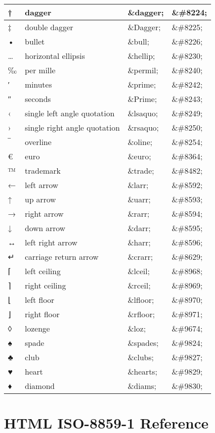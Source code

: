 \begin{longtable}{|l|l|l|l|}
\hline
†	&dagger							&\&dagger;	&\&\#8224;\\
\hline
‡	&double dagger					&\&Dagger;	&\&\#8225;\\
\hline
•	&bullet							&\&bull;		&\&\#8226;\\
\hline
…	&horizontal ellipsis				&\&hellip;	&\&\#8230;\\
\hline
‰	&per mille 						&\&permil;	&\&\#8240;\\
\hline
′	&minutes							&\&prime;	&\&\#8242;\\
\hline
″	&seconds						&\&Prime;	&\&\#8243;\\
\hline
‹	&single left angle quotation			&\&lsaquo;	&\&\#8249;\\
\hline
›	&single right angle quotation			&\&rsaquo;	&\&\#8250;\\
\hline
‾	&overline						&\&oline;		&\&\#8254;\\
\hline
€	&euro							&\&euro;		&\&\#8364;\\
\hline
™	&trademark						&\&trade;	&\&\#8482;\\
\hline
←	&left arrow						&\&larr;		&\&\#8592;\\
\hline
↑	&up arrow						&\&uarr;		&\&\#8593;\\
\hline
→	&right arrow						&\&rarr;		&\&\#8594;\\
\hline
↓	&down arrow						&\&darr;		&\&\#8595;\\
\hline
↔	&left right arrow					&\&harr;		&\&\#8596;\\
\hline
↵	&carriage return arrow				&\&crarr;		&\&\#8629;\\
\hline
⌈	&left ceiling						&\&lceil;		&\&\#8968;\\
\hline
⌉	&right ceiling						&\&rceil;		&\&\#8969;\\
\hline
⌊	&left floor						&\&lfloor;	&\&\#8970;\\
\hline
⌋	&right floor						&\&rfloor;	&\&\#8971;\\
\hline
◊	&lozenge						&\&loz;		&\&\#9674;\\
\hline
♠	&spade							&\&spades;	&\&\#9824;\\
\hline
♣	&club							&\&clubs;	&\&\#9827;\\
\hline
♥	&heart							&\&hearts;	&\&\#9829;\\
\hline
♦	&diamond						&\&diams;	&\&\#9830;\\
\hline

\end{longtable}

\section{HTML ISO-8859-1 Reference}

